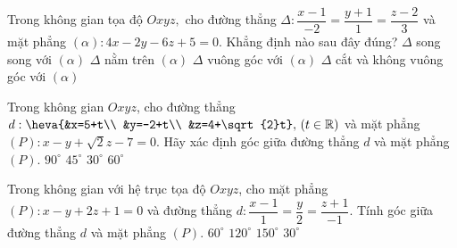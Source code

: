 	\begin{ex}%
	Trong không gian tọa độ $Oxyz,$ cho đường thẳng $\Delta\colon \dfrac{x-1}{-2}=\dfrac{y+1}1=\dfrac{z-2}{3}$ và mặt phẳng $(\alpha)\colon 4x-2y-6z+5=0.$ Khẳng định nào sau đây đúng?
	\choice
	{$\Delta$ song song với $(\alpha)$}
	{$\Delta$ nằm trên $(\alpha)$}
	{\True $\Delta$ vuông góc với $(\alpha)$}
	{$\Delta$ cắt và không vuông góc với $(\alpha)$}
	\end{ex}
	\begin{ex}%
	Trong không gian $Oxyz$, cho đường thẳng $d: \heva{&x=5+t\\ &y=-2+t\\ &z=4+\sqrt{2}t},\, (t\in\mathbb{R})$ và mặt phẳng $(P): x-y+\sqrt{2}z-7=0$. Hãy xác định góc giữa đường thẳng $d$ và mặt phẳng $(P)$.
	\choice
	{$90^\circ$}
	{$45^\circ$}
	{\True $30^\circ$}
	{$60^\circ$}
	\end{ex}
	\begin{ex}%
	Trong không gian với hệ trục tọa độ $Oxyz$, cho mặt phẳng $(P) \colon x-y+2z+1=0$ và đường thẳng $d: \dfrac{x-1}{1}=\dfrac{y}{2}=\dfrac{z+1}{-1}$. Tính góc giữa đường thẳng $d$ và mặt phẳng $(P)$.
	\choice
	{$60^{\circ} $}
	{$120^{\circ} $}
	{$150^{\circ} $}
	{\True $30^{\circ} $}
	\end{ex}
